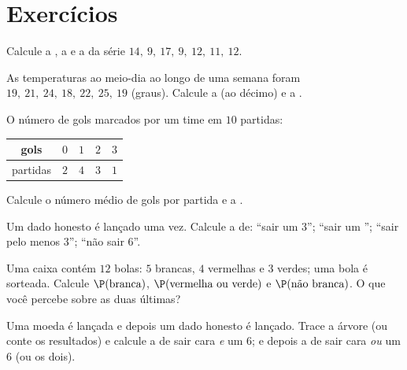 \section{Exercícios}

\begin{exercise}[$\star$]\label{exo:g9:statproba:1}
Calcule a , a  e a  da série
$14,\ 9,\ 17,\ 9,\ 12,\ 11,\ 12$.
\end{exercise}

\begin{exercise}[$\star$]\label{exo:g9:statproba:2}
As temperaturas ao meio-dia ao longo de uma semana foram
$19,\ 21,\ 24,\ 18,\ 22,\ 25,\ 19$ (graus). Calcule a  (ao
décimo) e a .
\end{exercise}

\begin{exercise}[$\star$]\label{exo:g9:statproba:3}
O número de gols marcados por um time em $10$ partidas:
\begin{center}
\renewcommand{\arraystretch}{1.2}
\begin{tabular}{c|cccc}
gols & $0$ & $1$ & $2$ & $3$ \\
\hline
partidas & $2$ & $4$ & $3$ & $1$ \\
\end{tabular}
\end{center}
Calcule o número médio de gols por partida e a .
\end{exercise}

\begin{exercise}[$\star$]\label{exo:g9:statproba:4}
Um dado honesto é lançado uma vez. Calcule a  de: ``sair
um $3$''; ``sair um ''; ``sair pelo menos $3$''; ``não sair
$6$''.
\end{exercise}

\begin{exercise}[$\star$]\label{exo:g9:statproba:5}
Uma caixa contém $12$ bolas: $5$ brancas, $4$ vermelhas e $3$ verdes;
uma bola é sorteada. Calcule $\P(\text{branca})$,
$\P(\text{vermelha ou verde})$ e $\P(\text{não branca})$. O que você
percebe sobre as duas últimas?
\end{exercise}

\begin{exercise}[$\star\star$]\label{exo:g9:statproba:6}
Uma moeda é lançada e depois um dado honesto é lançado. Trace a árvore
(ou conte os resultados) e calcule a  de sair cara \emph{e}
um $6$; e depois a de sair cara \emph{ou} um $6$ (ou os dois).
\end{exercise}

